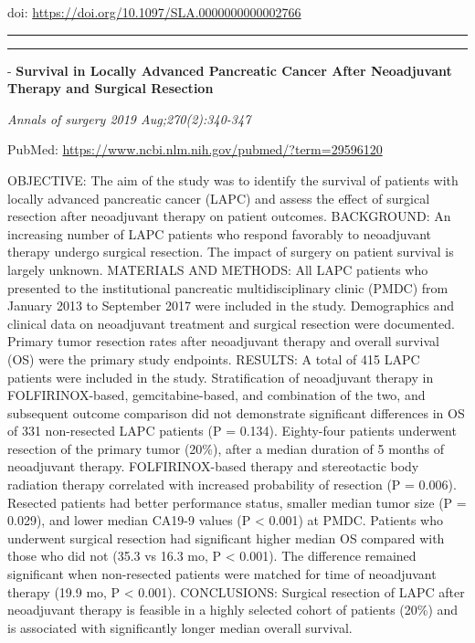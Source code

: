 \documentclass[]{article}
\begin{document}
doi: \url{https://doi.org/10.1097/SLA.0000000000002766}

{}

{}

\begin{center}\rule{0.5\linewidth}{\linethickness}\end{center}

\begin{center}\rule{0.5\linewidth}{\linethickness}\end{center}

 - \textbf{Survival in Locally Advanced Pancreatic Cancer After
Neoadjuvant Therapy and Surgical Resection}

\emph{Annals of surgery 2019 Aug;270(2):340-347}

PubMed: \url{https://www.ncbi.nlm.nih.gov/pubmed/?term=29596120}

OBJECTIVE: The aim of the study was to identify the survival of patients
with locally advanced pancreatic cancer (LAPC) and assess the effect of
surgical resection after neoadjuvant therapy on patient outcomes.
BACKGROUND: An increasing number of LAPC patients who respond favorably
to neoadjuvant therapy undergo surgical resection. The impact of surgery
on patient survival is largely unknown. MATERIALS AND METHODS: All LAPC
patients who presented to the institutional pancreatic multidisciplinary
clinic (PMDC) from January 2013 to September 2017 were included in the
study. Demographics and clinical data on neoadjuvant treatment and
surgical resection were documented. Primary tumor resection rates after
neoadjuvant therapy and overall survival (OS) were the primary study
endpoints. RESULTS: A total of 415 LAPC patients were included in the
study. Stratification of neoadjuvant therapy in FOLFIRINOX-based,
gemcitabine-based, and combination of the two, and subsequent outcome
comparison did not demonstrate significant differences in OS of 331
non-resected LAPC patients (P = 0.134). Eighty-four patients underwent
resection of the primary tumor (20\%), after a median duration of 5
months of neoadjuvant therapy. FOLFIRINOX-based therapy and stereotactic
body radiation therapy correlated with increased probability of
resection (P = 0.006). Resected patients had better performance status,
smaller median tumor size (P = 0.029), and lower median CA19-9 values (P
\textless{} 0.001) at PMDC. Patients who underwent surgical resection
had significant higher median OS compared with those who did not (35.3
vs 16.3 mo, P \textless{} 0.001). The difference remained significant
when non-resected patients were matched for time of neoadjuvant therapy
(19.9 mo, P \textless{} 0.001). CONCLUSIONS: Surgical resection of LAPC
after neoadjuvant therapy is feasible in a highly selected cohort of
patients (20\%) and is associated with significantly longer median
overall survival.
\end{document}
